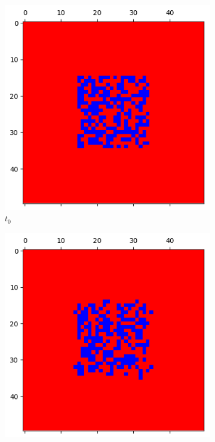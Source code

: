 \documentclass[letterpaper]{article}
\begin{document}
\begin{figure}[H]
    \begin{subfigure}{.33\textwidth}
      \centering
      \includegraphics[width=1\linewidth]{images/assign2/part32-defect/t0}
      \caption{$t_{0}$}
    \end{subfigure}
    \begin{subfigure}{.33\textwidth}
      \centering
      \includegraphics[width=1\linewidth]{images/assign2/part32-defect/t1}

\end{subfigure}
\end{figure}
\end{document}
